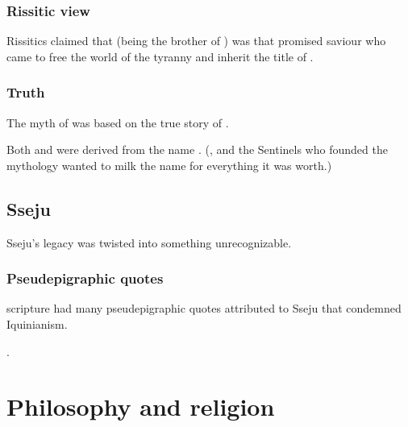 \subsubsection{Rissitic view}
Rissitics claimed that  (being the brother of ) was that promised saviour who came to free the world of the \iquinian tyranny and inherit the title of \Nechsain. 





\subsubsection{Truth}
The myth of \Mezzagrael was based on the true story of . 

Both \quo{\Mezzagrael} and \quo{\Nechsain} were derived from the name \quo{\Nexagglachel}. 
(, and the Sentinels who founded the \Ortaican mythology wanted to milk the name for everything it was worth.)









\subsection{Sseju}
Sseju's legacy was twisted into something unrecognizable.





\subsubsection{Pseudepigraphic quotes}
\Ortaican scripture had many pseudepigraphic quotes attributed to Sseju that condemned Iquinianism.

{\VizicarDurasRespina} . 















\section{Philosophy and religion}









